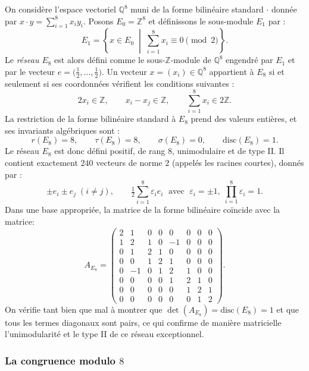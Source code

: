 \begin{exemple}[Le réseau $E_8$]
\label{ex:E8}
On considère l'espace vectoriel $\mathbb{Q}^8$ muni de la forme bilinéaire standard $\cdot$ donnée par $x \cdot y = \sum_{i=1}^8 x_i y_i$. Posons $E_0 = \mathbb{Z}^8$ et définissons le sous-module $E_1$ par :
\[
E_1 = \left\{ x \in E_0 \;\middle|\; \textstyle\sum_{i=1}^8 x_i \equiv 0 \pmod{2} \right\}.
\]
Le \emph{réseau $E_8$} est alors défini comme le sous-$\mathbb{Z}$-module de $\mathbb{Q}^8$ engendré par $E_1$ et par le vecteur $e = \bigl(\tfrac{1}{2}, \ldots, \tfrac{1}{2}\bigr)$. Un vecteur $x = (x_i) \in \mathbb{Q}^8$ appartient à $E_8$ si et seulement si ses coordonnées vérifient les conditions suivantes :
\[
2x_i \in \mathbb{Z}, \qquad x_i - x_j \in \mathbb{Z}, \qquad \textstyle\sum_{i=1}^8 x_i \in 2\mathbb{Z}.
\]
La restriction de la forme bilinéaire standard à $E_8$ prend des valeurs entières, et ses invariants algébriques sont :
\[
r(E_8) = 8, \qquad \tau(E_8) = 8, \qquad \sigma(E_8) = 0, \qquad \text{disc}(E_8) = 1.
\]
Le réseau $E_8$ est donc défini positif, de rang $8$, unimodulaire et de type II. Il contient exactement $240$ vecteurs de norme $2$ (appelés les racines courtes), donnés par :
\[
\pm e_i \pm e_j \; (i \neq j), \qquad
\tfrac{1}{2}\textstyle\sum_{i=1}^8 \varepsilon_i e_i \;\text{ avec }\;
\varepsilon_i = \pm 1,\; \textstyle\prod_{i=1}^8 \varepsilon_i = 1.
\]
Dans une base appropriée, la matrice de la forme bilinéaire coïncide avec la matrice:
\[
A_{E_8} = \begin{pmatrix}
    2  & 1  & 0  & 0  & 0  & 0  & 0  & 0 \\
    1  & 2  & 1  & 0  & -1 & 0  & 0  & 0 \\
    0  & 1  & 2  & 1  & 0  & 0  & 0  & 0 \\
    0  & 0  & 1  & 2  & 1  & 0  & 0  & 0 \\
    0  & -1 & 0  & 1  & 2  & 1  & 0  & 0 \\
    0  & 0  & 0  & 0  & 1  & 2  & 1  & 0 \\
    0  & 0  & 0  & 0  & 0  & 1  & 2  & 1 \\
    0  & 0  & 0  & 0  & 0  & 0  & 1  & 2
\end{pmatrix}.
\]
On vérifie tant bien que mal à montrer que $\det(A_{E_8}) = \text{disc}(E_8) = 1$ et que tous les termes diagonaux sont pairs, ce qui confirme de manière matricielle l'unimodularité et le type II de ce réseau exceptionnel.
\end{exemple}
\subsubsection{La congruence modulo $8$}


